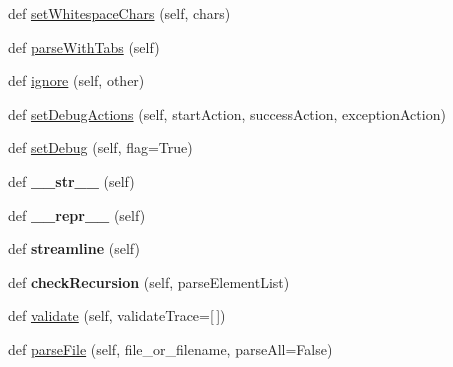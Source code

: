 \begin{DoxyCompactItemize}
\item 
def \hyperlink{classsetuptools_1_1__vendor_1_1pyparsing_1_1_parser_element_a64f1dbcc7765fbc8899bd0ae8de22e54}{set\+Whitespace\+Chars} (self, chars)
\item 
def \hyperlink{classsetuptools_1_1__vendor_1_1pyparsing_1_1_parser_element_a6a477b4b208bb35b986767e437994633}{parse\+With\+Tabs} (self)
\item 
def \hyperlink{classsetuptools_1_1__vendor_1_1pyparsing_1_1_parser_element_a8312fa721c50e624c6aaeb5b414f6f8b}{ignore} (self, other)
\item 
def \hyperlink{classsetuptools_1_1__vendor_1_1pyparsing_1_1_parser_element_ad451f13e3d97e07edc726f65fecc37a8}{set\+Debug\+Actions} (self, start\+Action, success\+Action, exception\+Action)
\item 
def \hyperlink{classsetuptools_1_1__vendor_1_1pyparsing_1_1_parser_element_ae589616c030e7bc76f86c139b60e2bc6}{set\+Debug} (self, flag=True)
\item 
\mbox{\label{classsetuptools_1_1__vendor_1_1pyparsing_1_1_parser_element_a62581c4d9d309878385b1111fd390473}} 
def {\bfseries \+\_\+\+\_\+str\+\_\+\+\_\+} (self)
\item 
\mbox{\label{classsetuptools_1_1__vendor_1_1pyparsing_1_1_parser_element_ac68444f387913611e94b7038a49c507c}} 
def {\bfseries \+\_\+\+\_\+repr\+\_\+\+\_\+} (self)
\item 
\mbox{\label{classsetuptools_1_1__vendor_1_1pyparsing_1_1_parser_element_ac6937508ff09119b5bd3b6d7b6711845}} 
def {\bfseries streamline} (self)
\item 
\mbox{\label{classsetuptools_1_1__vendor_1_1pyparsing_1_1_parser_element_a44ad5922689943f83c7d3b058f703175}} 
def {\bfseries check\+Recursion} (self, parse\+Element\+List)
\item 
def \hyperlink{classsetuptools_1_1__vendor_1_1pyparsing_1_1_parser_element_ad3e1e503c2a2e6bbece407e4e6b68651}{validate} (self, validate\+Trace=\mbox{[}$\,$\mbox{]})
\item 
def \hyperlink{classsetuptools_1_1__vendor_1_1pyparsing_1_1_parser_element_a9d224aee01e69b56fc10f467c860e78c}{parse\+File} (self, file\+\_\+or\+\_\+filename, parse\+All=False)

\end{DoxyCompactItemize}
